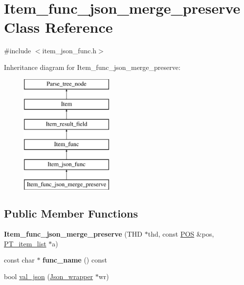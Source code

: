 \hypertarget{classItem__func__json__merge__preserve}{}\section{Item\+\_\+func\+\_\+json\+\_\+merge\+\_\+preserve Class Reference}
\label{classItem__func__json__merge__preserve}


{\ttfamily \#include $<$item\+\_\+json\+\_\+func.\+h$>$}

Inheritance diagram for Item\+\_\+func\+\_\+json\+\_\+merge\+\_\+preserve\+:\begin{figure}[H]
\begin{center}
\leavevmode
\includegraphics[height=6.000000cm]{classItem__func__json__merge__preserve}
\end{center}
\end{figure}
\subsection*{Public Member Functions}
\begin{DoxyCompactItemize}
\item 
\mbox{\label{classItem__func__json__merge__preserve_aca0cdc818f0c0b342d7499ba319223a2}} 
{\bfseries Item\+\_\+func\+\_\+json\+\_\+merge\+\_\+preserve} (T\+HD $\ast$thd, const \mbox{\hyperlink{structYYLTYPE}{P\+OS}} \&pos, \mbox{\hyperlink{classPT__item__list}{P\+T\+\_\+item\+\_\+list}} $\ast$a)
\item 
\mbox{\label{classItem__func__json__merge__preserve_ae3d7e98d982ee01ec72c7da7a7353eb3}} 
const char $\ast$ {\bfseries func\+\_\+name} () const
\item 
bool \mbox{\hyperlink{classItem__func__json__merge__preserve_a50d0baf1a3e3ad6644db48253bb8990a}{val\+\_\+json}} (\mbox{\hyperlink{classJson__wrapper}{Json\+\_\+wrapper}} $\ast$wr)
\end{DoxyCompactItemize}

